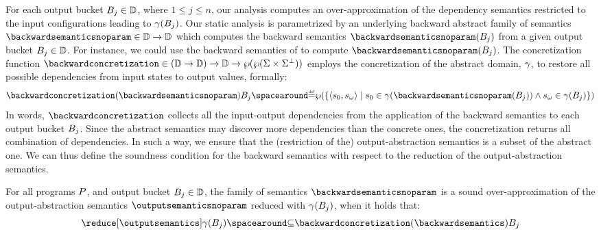 For each output bucket ${B}_{j}\in\mathbb{D}$, where $1 \le j \le n$, our analysis computes an over-approximation of the dependency semantics restricted to the input configurations leading to $\gamma({B}_{j})$.
%
Our static analysis is parametrized by an underlying backward abstract family
of semantics $\backwardsemanticsnoparam\in\backwardtype$ which computes the backward semantics $\backwardsemanticsnoparam(\bucket)$ from a given output bucket ${B}_{j}\in\mathbb{D}$.
For instance, we could use the backward semantics of  to compute $\backwardsemanticsnoparam(\bucket)$.
The concretization function $\backwardconcretization\in(\backwardtype)\to\abstractdomain\to\outputtype$ employs the concretization of the abstract domain, \cf{}
$\gamma$, to restore all possible dependencies from input states to output values, formally:
\[
  \backwardconcretization(\backwardsemanticsnoparam)\bucket \DefeQ
  \setof{\setdef{
    \inputoutputtuple{\defstate}
  }{
    \retrieveinput{\defstate}\in\abstractdomainconcretization(\backwardsemanticsnoparam(\bucket))\land\retrieveoutput{\defstate}\in\abstractdomainconcretization(\bucket)
    }
  }
  \]
In words, $\backwardconcretization$ collects all the input-output dependencies from the application of the backward semantics to each output bucket ${B}_{j}$.
Since the abstract semantics may discover more dependencies than the concrete ones, the concretization returns all combination of dependencies.
In such a way, we ensure that the (restriction of the) output-abstraction semantics is a subset of the abstract one.
%
We can thus define the soundness condition for the backward semantics with respect to the reduction of the output-abstraction semantics.


\begin{definition}
  For all programs $P$, and output bucket ${B}_{j}\in\mathbb{D}$, the family of semantics $\backwardsemanticsnoparam$ is a \textup{sound over-approximation} of the output-abstraction semantics $\outputsemanticsnoparam$ reduced with  $\gamma({B}_{j})$, when it holds that:
  \[\reducedoutputsemantics \SubseteQ \backwardconcretization(\backwardsemantics)\bucket\]
\end{definition}

